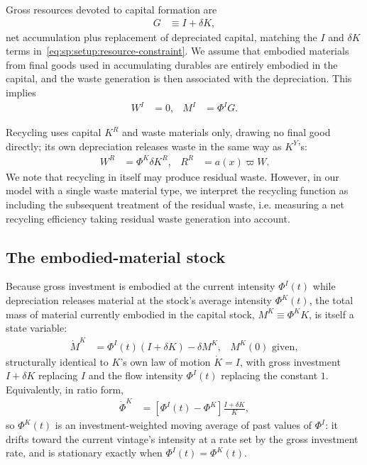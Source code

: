  Gross resources devoted to capital formation are
\begin{align}
G &\equiv I+\delta K,
\label{eq:sp:setup:gross-formation}
\end{align}
net accumulation plus replacement of depreciated capital, matching the $I$ and $\delta K$ terms in~\eqref{eq:sp:setup:resource-constraint}. We assume that embodied materials from final goods used in accumulating durables are entirely embodied in the capital, and the waste generation is then associated with the depreciation. This implies
\begin{align}
    W^I &= 0, & M^I &= \Phi^IG.
\label{eq:sp:setup:investment}
\end{align}


 Recycling uses capital $K^R$ and waste materials only, drawing no final good directly; its own depreciation releases waste in the same way as $K^Y$'s:
\begin{align}
W^R &= \Phi^K\delta K^R, & R^R &= a\!\left(x\right)\varpi W.
\label{eq:sp:setup:recycling-mass}
\end{align}
We note that recycling in itself may produce residual waste. However, in our model with a single waste material type, we interpret the recycling function as including the subsequent treatment of the residual waste, i.e. measuring a net recycling efficiency taking residual waste generation into account. 

\subsection{The embodied-material stock}
\label{sec:sp:setup:embodied-stock}
Because gross investment is embodied at the current intensity $\Phi^I(t)$ while depreciation releases material at the stock's average intensity $\Phi^K(t)$, the total mass of material currently embodied in the capital stock, $M^K\equiv\Phi^KK$, is itself a state variable:
\begin{align}
\dot M^K &= \Phi^I(t)\left(I+\delta K\right)-\delta M^K,
&
M^K(0) \text{ given},
\label{eq:sp:setup:Phi-motion}
\end{align}
structurally identical to $K$'s own law of motion $\dot K=I$, with gross investment $I+\delta K$ replacing $I$ and the flow intensity $\Phi^I(t)$ replacing the constant $1$. Equivalently, in ratio form,
\begin{align}
\dot\Phi^K &= \left[\Phi^I(t)-\Phi^K\right]\frac{I+\delta K}{K},
\label{eq:sp:setup:phiK-motion}
\end{align}
so $\Phi^K(t)$ is an investment-weighted moving average of past values of $\Phi^I$: it drifts toward the current vintage's intensity at a rate set by the gross investment rate, and is stationary exactly when $\Phi^I(t)=\Phi^K(t)$.



